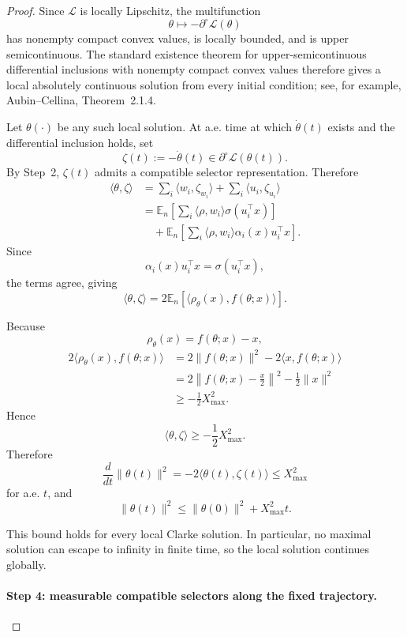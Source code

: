 \documentclass{article} %
\theoremstyle{plain}
\theoremstyle{definition}
\theoremstyle{remark}
\begin{document}
\begin{proof}
Since $\mathcal L$ is locally Lipschitz, the multifunction
\[
\theta
\longmapsto
-\partial^\circ\mathcal L(\theta)
\]
has nonempty compact convex values, is locally bounded, and is upper
semicontinuous. The standard existence theorem for upper-semicontinuous
differential inclusions with nonempty compact convex values therefore gives
a local absolutely continuous solution from every initial condition; see,
for example, Aubin--Cellina, Theorem~2.1.4.

Let $\theta(\cdot)$ be any such local solution. At a.e. time at which
$\dot\theta(t)$ exists and the differential inclusion holds, set
\[
\zeta(t):=-\dot\theta(t)
\in
\partial^\circ\mathcal L(\theta(t)).
\]
By Step~2, $\zeta(t)$ admits a compatible selector representation. Therefore
\[
\begin{aligned}
\langle\theta,\zeta\rangle
&=
\sum_i
\langle
w_i,\zeta_{w_i}
\rangle
+
\sum_i
\langle
u_i,\zeta_{u_i}
\rangle
\\
&=
\mathbb E_n
\left[
\sum_i
\langle\rho,w_i\rangle
\sigma(u_i^\top x)
\right]
\\
&\quad+
\mathbb E_n
\left[
\sum_i
\langle\rho,w_i\rangle
\alpha_i(x)u_i^\top x
\right].
\end{aligned}
\]
Since
\[
\alpha_i(x)u_i^\top x
=
\sigma(u_i^\top x),
\]
the terms agree, giving
\[
\boxed{
\langle\theta,\zeta\rangle
=
2\mathbb E_n
\left[
\langle
\rho_\theta(x),
f(\theta;x)
\rangle
\right].
}
\]

Because
\[
\rho_\theta(x)
=
f(\theta;x)-x,
\]
\[
\begin{aligned}
2\langle
\rho_\theta(x),
f(\theta;x)
\rangle
&=
2\|f(\theta;x)\|^2
-
2\langle x,f(\theta;x)\rangle
\\
&=
2\left\|
f(\theta;x)-\frac{x}{2}
\right\|^2
-
\frac12\|x\|^2
\\
&\ge
-\frac12X_{\max}^2.
\end{aligned}
\]
Hence
\[
\langle\theta,\zeta\rangle
\ge
-\frac12X_{\max}^2.
\]
Therefore
\[
\frac{d}{dt}\|\theta(t)\|^2
=
-2\langle\theta(t),\zeta(t)\rangle
\le
X_{\max}^2
\]
for a.e. $t$, and
\[
\|\theta(t)\|^2
\le
\|\theta(0)\|^2
+
X_{\max}^2t.
\]

This bound holds for every local Clarke solution. In particular, no maximal
solution can escape to infinity in finite time, so the local solution
continues globally.

\paragraph{Step 4: measurable compatible selectors along the fixed
trajectory.}


\end{proof}
\end{document}
